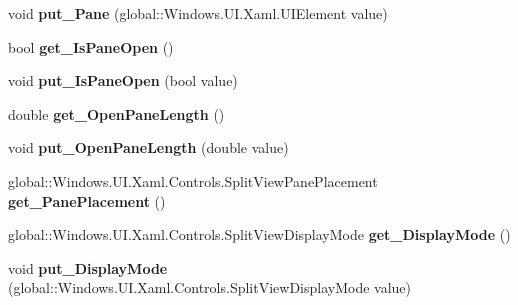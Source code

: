 \begin{DoxyCompactItemize}
void {\bfseries put\+\_\+\+Pane} (global\+::\+Windows.\+U\+I.\+Xaml.\+U\+I\+Element value)
\item 
\mbox{\label{interface_windows_1_1_u_i_1_1_xaml_1_1_controls_1_1_i_split_view_a0d4584bb7eb3b5f27f459450b6bc13e2}} 
bool {\bfseries get\+\_\+\+Is\+Pane\+Open} ()
\item 
\mbox{\label{interface_windows_1_1_u_i_1_1_xaml_1_1_controls_1_1_i_split_view_a676e370b7973fc04fa22ea1c13c5b739}} 
void {\bfseries put\+\_\+\+Is\+Pane\+Open} (bool value)
\item 
\mbox{\label{interface_windows_1_1_u_i_1_1_xaml_1_1_controls_1_1_i_split_view_a99f8d7f7c0235d00bf56e1224ea0410c}} 
double {\bfseries get\+\_\+\+Open\+Pane\+Length} ()
\item 
\mbox{\label{interface_windows_1_1_u_i_1_1_xaml_1_1_controls_1_1_i_split_view_a92b1399298c0fd5087100c36bd7fe8f5}} 
void {\bfseries put\+\_\+\+Open\+Pane\+Length} (double value)
\item 
\mbox{\label{interface_windows_1_1_u_i_1_1_xaml_1_1_controls_1_1_i_split_view_ab795867716cdcc78c0ee7c7f7cdb8a70}} 
global\+::\+Windows.\+U\+I.\+Xaml.\+Controls.\+Split\+View\+Pane\+Placement {\bfseries get\+\_\+\+Pane\+Placement} ()
\item 
\mbox{\label{interface_windows_1_1_u_i_1_1_xaml_1_1_controls_1_1_i_split_view_a5c6b5fd189586ae6a4809f2028b036e9}} 
global\+::\+Windows.\+U\+I.\+Xaml.\+Controls.\+Split\+View\+Display\+Mode {\bfseries get\+\_\+\+Display\+Mode} ()
\item 
\mbox{\label{interface_windows_1_1_u_i_1_1_xaml_1_1_controls_1_1_i_split_view_a31d4c4574b734f77622f95bc78b04c1a}} 
void {\bfseries put\+\_\+\+Display\+Mode} (global\+::\+Windows.\+U\+I.\+Xaml.\+Controls.\+Split\+View\+Display\+Mode value)
\item 

\end{DoxyCompactItemize}
